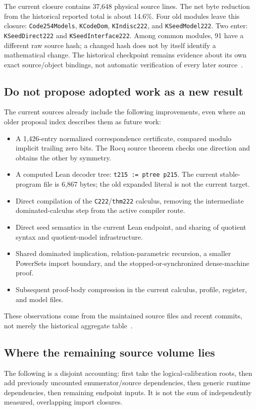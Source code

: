 \documentclass[11pt]{article}
\theoremstyle{remark}\newtheorem{remark}[theorem]{Remark}
\newcommand{\code}[1]{\texttt{\small #1}}
\begin{document}
The current closure contains 37,648 physical source lines. The net byte reduction from the historical reported total is about 14.6\%. Four old modules leave this closure: \code{Code254Models}, \code{KCodeDom}, \code{KIndisc222}, and \code{KSeedModel222}. Two enter: \code{KSeedDirect222} and \code{KSeedInterface222}. Among common modules, 91 have a different raw source hash; a changed hash does not by itself identify a mathematical change. The historical checkpoint remains evidence about its own exact source/object bindings, not automatic verification of every later source~\cite{phase15}.

\subsection{Do not propose adopted work as a new result}
The current sources already include the following improvements, even where an older proposal index describes them as future work:
\begin{itemize}
\item A 1,426-entry normalized correspondence certificate, compared modulo implicit trailing zero bits. The Rocq source theorem checks one direction and obtains the other by symmetry.
\item A computed Lean decoder tree: \code{t215 := ptree p215}. The current stable-program file is 6,867 bytes; the old expanded literal is not the current target.
\item Direct compilation of the \code{C222}/\code{thm222} calculus, removing the intermediate dominated-calculus step from the active compiler route.
\item Direct seed semantics in the current Lean endpoint, and sharing of quotient syntax and quotient-model infrastructure.
\item Shared dominated implication, relation-parametric recursion, a smaller PowerSets import boundary, and the stopped-or-synchronized dense-machine proof.
\item Subsequent proof-body compression in the current calculus, profile, register, and model files.
\end{itemize}
These observations come from the maintained source files and recent commits, not merely the historical aggregate table~\cite{source,leanchecker,endpointshared,computed,proposals}.

\subsection{Where the remaining source volume lies}
The following is a disjoint accounting: first take the logical-calibration roots, then add previously uncounted enumerator/source dependencies, then generic runtime dependencies, then remaining endpoint inputs. It is not the sum of independently measured, overlapping import closures.
\end{document}
